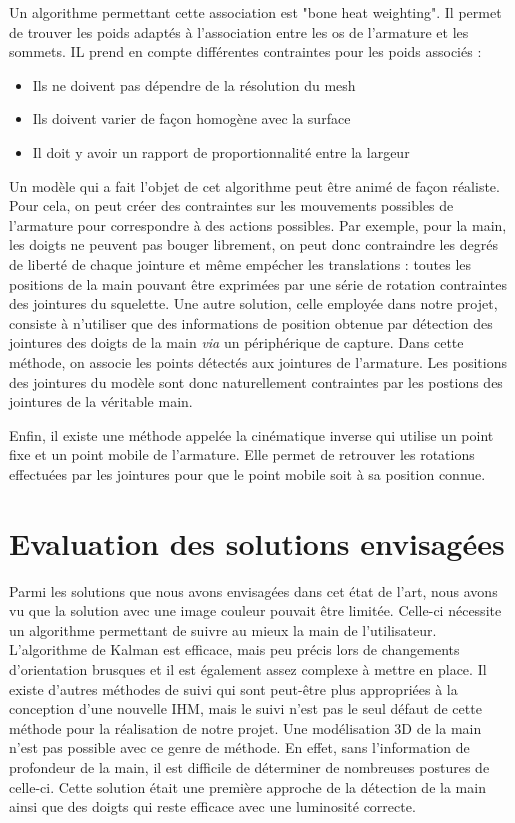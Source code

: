 Un algorithme permettant cette association est "bone heat weighting". \cite{baran2007automatic}
Il permet de trouver les poids adaptés à l'association entre les os de l'armature et les sommets. IL prend en compte différentes contraintes pour les poids associés : \\
\begin{itemize}
	\item Ils ne doivent pas dépendre de la résolution du mesh

	\item Ils doivent varier de façon homogène avec la surface
	\item Il doit y avoir un rapport de proportionnalité entre la largeur 
\end{itemize}

Un modèle qui a fait l'objet de cet algorithme peut être \og animé \fg  de façon réaliste.
Pour cela, on peut créer des contraintes sur les mouvements possibles de l'armature pour correspondre à des actions possibles. 
Par exemple, pour la main, les doigts ne peuvent pas bouger librement, on peut donc contraindre les degrés de liberté de chaque jointure et même empécher les translations : toutes les positions de la main pouvant être exprimées par une série de rotation contraintes des jointures du squelette.
Une autre solution, celle employée dans notre projet, consiste à n'utiliser que des informations de position obtenue par détection des jointures des doigts de la main \textit{via} un périphérique de capture.
Dans cette méthode, on associe les points détectés aux jointures de l'armature. Les positions des jointures du modèle sont donc naturellement contraintes par les postions des jointures de la véritable main.

Enfin, il existe une méthode appelée la cinématique inverse qui utilise un point fixe et un point mobile de l'armature. Elle permet de retrouver les rotations effectuées par les jointures pour que le point mobile soit à sa position connue.


\section{Evaluation des solutions envisagées}
Parmi les solutions que nous avons envisagées dans cet état de l'art, nous avons vu que la solution avec une 
image couleur pouvait être limitée. Celle-ci nécessite un algorithme permettant de suivre au mieux
la main de l'utilisateur. L'algorithme de Kalman est efficace, mais peu précis lors de changements d'orientation
brusques et il est également assez complexe à mettre en place. Il existe d'autres méthodes de suivi qui sont
peut-être plus appropriées à la conception d'une nouvelle IHM, mais le suivi n'est pas le seul défaut de cette
méthode pour la réalisation de notre projet. Une 
modélisation 3D de la main n'est pas possible avec ce genre de méthode. En effet, sans l'information de 
profondeur de la main, il est difficile de déterminer de nombreuses postures de celle-ci. Cette solution était une première approche de la 
détection de la main ainsi que des doigts qui reste efficace avec une luminosité correcte.\\

